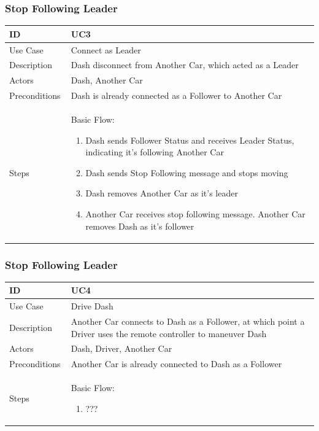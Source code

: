 \documentclass[12pt]{article}
\begin{document}
\subsubsection{Stop Following Leader}
\begin{longtable}{| p{0.2\linewidth} | p{0.8\linewidth} |}\hline 
    ID & UC3\\ \hline
    Use Case & Connect as Leader\\ \hline
    Description & Dash disconnect from Another Car, which acted as a Leader\\ \hline
    Actors & Dash, Another Car\\ \hline
    Preconditions & Dash is already connected as a Follower to Another Car\\ \hline
    Steps & Basic Flow: \begin{enumerate} %
        \itemsep 0em %
    	\item Dash sends Follower Status and receives Leader Status, indicating it’s following Another Car
		\item Dash sends Stop Following message and stops moving
        \item Dash removes Another Car as it’s leader
        \item Another Car receives stop following message. Another Car removes Dash as it’s follower
	\end{enumerate}\\ \hline
\end{longtable}

\subsubsection{Stop Following Leader}
\begin{longtable}{| p{0.2\linewidth} | p{0.8\linewidth} |}\hline 
    ID & UC4\\ \hline
    Use Case & Drive Dash\\ \hline
    Description & Another Car connects to Dash as a Follower, at which point a Driver uses the remote controller to maneuver Dash\\ \hline
    Actors & Dash, Driver, Another Car\\ \hline
    Preconditions & Another Car is already connected to Dash as a Follower\\ \hline
    Steps & Basic Flow: \begin{enumerate} %
        \itemsep 0em %
    	\item ???
	\end{enumerate}\\ \hline
\end{longtable}
\end{document}
